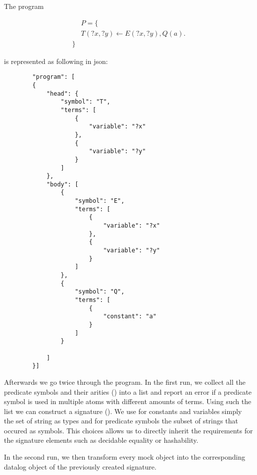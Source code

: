\begin{example}
    The program 

    \begin{equation}
        \begin{split}
            &P = \{  \\
            &T(?x,?y) \leftarrow E(?x,?y), Q(a).\\
            \}
        \end{split}
    \end{equation}

    is represented as following in json:

    \begin{lstlisting}
        "program": [
        {
            "head": {
                "symbol": "T",
                "terms": [
                    {
                        "variable": "?x"
                    },
                    {
                        "variable": "?y"
                    }
                ]
            },
            "body": [
                {
                    "symbol": "E",
                    "terms": [
                        {
                            "variable": "?x"
                        },
                        {
                            "variable": "?y"
                        }
                    ]
                },
                {
                    "symbol": "Q",
                    "terms": [
                        {
                            "constant": "a"
                        }
                    ]
                }

            ]
        }]
    \end{lstlisting}
\end{example}

Afterwards we go twice through the program. In the first run, we collect all the predicate symbols and their arities (\parsingArityHelper) into a list and report an error if a predicate symbol is used in multiple atoms with different amounts of terms. Using such the list we can construct a signature (\parsingSignature). We use for constants and variables simply the set of string as types and for predicate symbols the subset of strings that occured as symbols. This choices allows us to directly inherit the requirements for the signature elements such as decidable equality or hashability. 

In the second run, we then transform every mock object into the corresponding datalog object of the previously created signature. 

